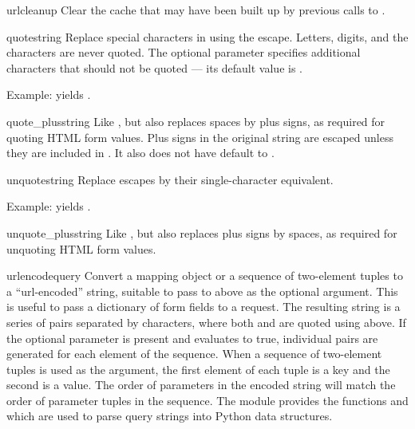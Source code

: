 \begin{funcdesc}{urlcleanup}{}
Clear the cache that may have been built up by previous calls to
.
\end{funcdesc}

\begin{funcdesc}{quote}{string}
Replace special characters in  using the  escape.
Letters, digits, and the characters  are never quoted.
The optional  parameter specifies additional characters
that should not be quoted --- its default value is .

Example:  yields .
\end{funcdesc}

\begin{funcdesc}{quote_plus}{string}
Like , but also replaces spaces by plus signs, as
required for quoting HTML form values.  Plus signs in the original
string are escaped unless they are included in .  It also
does not have  default to .
\end{funcdesc}

\begin{funcdesc}{unquote}{string}
Replace  escapes by their single-character equivalent.

Example:  yields .
\end{funcdesc}

\begin{funcdesc}{unquote_plus}{string}
Like , but also replaces plus signs by spaces, as
required for unquoting HTML form values.
\end{funcdesc}

\begin{funcdesc}{urlencode}{query}
Convert a mapping object or a sequence of two-element tuples  to a
``url-encoded'' string, suitable to pass to
 above as the optional  argument.  This
is useful to pass a dictionary of form fields to a 
request.  The resulting string is a series of
 pairs separated by \character{\&}
characters, where both  and  are quoted using
 above.  If the optional parameter  is
present and evaluates to true, individual  pairs
are generated for each element of the sequence.
When a sequence of two-element tuples is used as the  argument,
the first element of each tuple is a key and the second is a value.  The
order of parameters in the encoded string will match the order of parameter
tuples in the sequence.
The  module provides the functions
 and  which are used to
parse query strings into Python data structures.
\end{funcdesc}

